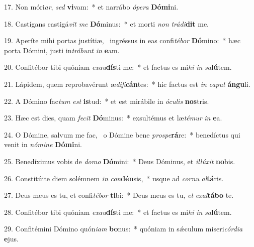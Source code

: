 17. Non móri\textit{ar}, \textit{sed} \textbf{vi}vam:~*  et narrábo \textit{ó}\textit{pe}\textit{ra} \textbf{Dó}\textbf{mi}ni.\

18. Castígans castigá\textit{vit} \textit{me} \textbf{Dó}minus:~*  et morti \textit{non} \textit{trá}\textit{di}\textbf{dit} me.\

19. Aperíte mihi portas justítiæ, \dag\  ingréssus in eas confi\textit{té}\textit{bor} \textbf{Dó}mino:~*  hæc porta Dómini, justi in\textit{trá}\textit{bunt} \textit{in} \textbf{e}am.\

20. Confitébor tibi quóniam \textit{ex}\textit{au}\textbf{dís}ti me:~*  et factus es mi\textit{hi} \textit{in} \textit{sa}\textbf{lú}tem.\

21. Lápidem, quem reprobavérunt æ\textit{di}\textit{fi}\textbf{cán}tes:~*  hic factus est \textit{in} \textit{ca}\textit{put} \textbf{án}\textbf{gu}li.\

22. A Dómino fac\textit{tum} \textit{est} \textbf{is}tud:~*  et est mirábile in \textit{ó}\textit{cu}\textit{lis} \textbf{nos}tris.\

23. Hæc est dies, quam \textit{fe}\textit{cit} \textbf{Dó}minus:~*  exsultémus et læ\textit{té}\textit{mur} \textit{in} \textbf{e}a.\

24. O Dómine, salvum me fac, \dag\  o Dómine bene \textit{pro}\textit{spe}\textbf{rá}re:~*  benedíctus qui venit in \textit{nó}\textit{mi}\textit{ne} \textbf{Dó}\textbf{mi}ni.\

25. Benedíximus vobis de \textit{do}\textit{mo} \textbf{Dó}mini:~*  Deus Dóminus, et \textit{il}\textit{lú}\textit{xit} \textbf{no}bis.\

26. Constitúite diem solémnem \textit{in} \textit{con}\textbf{dén}sis,~*  usque ad \textit{cor}\textit{nu} \textit{al}\textbf{tá}ris.\

27. Deus meus es tu, et confi\textit{té}\textit{bor} \textbf{ti}bi:~*  Deus meus es tu, \textit{et} \textit{ex}\textit{al}\textbf{tá}\textbf{bo} te.\

28. Confitébor tibi quóniam \textit{ex}\textit{au}\textbf{dís}ti me:~*  et factus es mi\textit{hi} \textit{in} \textit{sa}\textbf{lú}tem.\

29. Confitémini Dómino quón\textit{i}\textit{am} \textbf{bo}nus:~*  quóniam in sǽculum miseri\textit{cór}\textit{di}\textit{a} \textbf{e}jus.\

